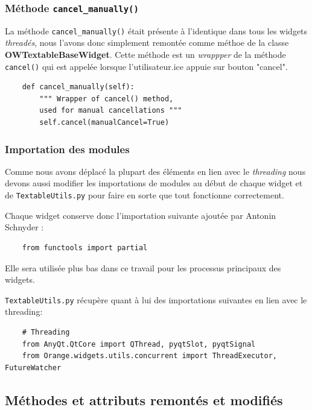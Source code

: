 \documentclass{article}
\begin{document}
\subsubsection{Méthode \texttt{cancel\_manually()}}

La méthode \texttt{cancel\_manually()} était présente à l'identique dans tous les widgets \textit{threadés}, nous l'avons donc simplement remontée comme méthoe de la classe \textbf{OWTextableBaseWidget}. Cette méthode est un \textit{wrappper} de la méthode \texttt{cancel()} qui est appelée lorsque l'utilisateur.ice appuie sur bouton "cancel".

\begin{verbatim}
    def cancel_manually(self):
        """ Wrapper of cancel() method,
        used for manual cancellations """
        self.cancel(manualCancel=True)
\end{verbatim}

\subsubsection{Importation des modules}

Comme nous avons déplacé la plupart des éléments en lien avec le \textit{threading} nous devons aussi modifier les importations de modules au début de chaque widget et de \texttt{TextableUtils.py} pour faire en sorte que tout fonctionne correctement.

Chaque widget conserve donc l'importation suivante ajoutée par Antonin Schnyder : 

\begin{verbatim}
    from functools import partial
\end{verbatim}

Elle sera utilisée plus bas dans ce travail pour les processus principaux des widgets.

\texttt{TextableUtils.py} récupère quant à lui des importations suivantes en lien avec le threading:

\begin{verbatim}
    # Threading
    from AnyQt.QtCore import QThread, pyqtSlot, pyqtSignal
    from Orange.widgets.utils.concurrent import ThreadExecutor, FutureWatcher
\end{verbatim}



\subsection{Méthodes et attributs remontés et modifiés}
\end{document}
